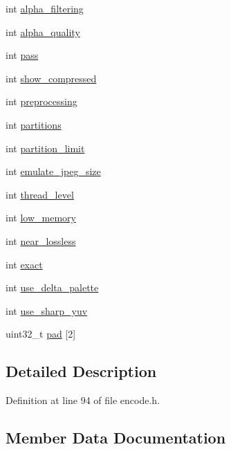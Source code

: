 \begin{DoxyCompactItemize}
int \mbox{\hyperlink{struct_web_p_config_a1657d146a2545b437f93d3b5d2cb2648}{alpha\+\_\+filtering}}
\item 
int \mbox{\hyperlink{struct_web_p_config_ab2955a1dcb8c70b5c7418dc909ba6a3a}{alpha\+\_\+quality}}
\item 
int \mbox{\hyperlink{struct_web_p_config_a72556386749d24fc3bf8b5f9c869b962}{pass}}
\item 
int \mbox{\hyperlink{struct_web_p_config_adcec1e569a003d4efd78952e145e4dfa}{show\+\_\+compressed}}
\item 
int \mbox{\hyperlink{struct_web_p_config_a913a25288e6f81b2918782d2bed979fa}{preprocessing}}
\item 
int \mbox{\hyperlink{struct_web_p_config_aeb79c9c630ea18d5481e9afdf6380d76}{partitions}}
\item 
int \mbox{\hyperlink{struct_web_p_config_aee37a73b2ee4ef1833fa4871fd4b52e3}{partition\+\_\+limit}}
\item 
int \mbox{\hyperlink{struct_web_p_config_a9f67a711a11505b326a16976252c05e0}{emulate\+\_\+jpeg\+\_\+size}}
\item 
int \mbox{\hyperlink{struct_web_p_config_a18e923afcaf8e5aa4dac76fd6bdef9ad}{thread\+\_\+level}}
\item 
int \mbox{\hyperlink{struct_web_p_config_a20c29885747e7b6a7dcbaabcad695449}{low\+\_\+memory}}
\item 
int \mbox{\hyperlink{struct_web_p_config_aaa49da995d138314195ed79ed44e0be4}{near\+\_\+lossless}}
\item 
int \mbox{\hyperlink{struct_web_p_config_a0f2a9d29de904bedd37c9edd9dec6a34}{exact}}
\item 
int \mbox{\hyperlink{struct_web_p_config_a2522c543dccb09bb5eefc83e7dd99a43}{use\+\_\+delta\+\_\+palette}}
\item 
int \mbox{\hyperlink{struct_web_p_config_a4fc68efa474b3b8e42dcb467f84af982}{use\+\_\+sharp\+\_\+yuv}}
\item 
uint32\+\_\+t \mbox{\hyperlink{struct_web_p_config_a1f91415636baf4d002ac13d366258269}{pad}} \mbox{[}2\mbox{]}
\end{DoxyCompactItemize}


\subsection{Detailed Description}


Definition at line 94 of file encode.\+h.



\subsection{Member Data Documentation}
\mbox{\label{struct_web_p_config_ab0374897d1c6c0564bb6e07cb6126a79}} 

